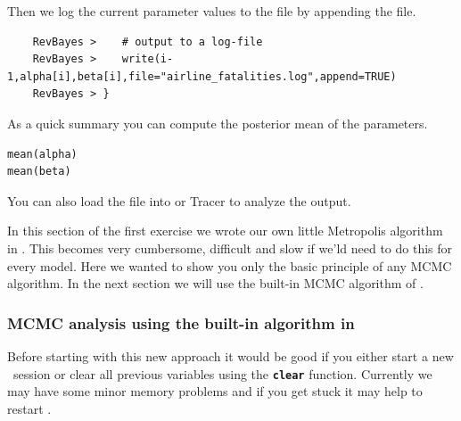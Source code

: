 \documentclass[11pt]{article}
\newcommand{\cl}[1]{{\texttt{\textbf{#1}}}}
\begin{document}
Then we log the current parameter values to the file by appending the file.
{\tt \begin{snugshade*}
\begin{lstlisting}    
    RevBayes >    # output to a log-file
    RevBayes >    write(i-1,alpha[i],beta[i],file="airline_fatalities.log",append=TRUE)
    RevBayes > }
\end{lstlisting}
\end{snugshade*}}
As a quick summary you can compute the posterior mean of the parameters.
{\tt \begin{snugshade*}
\begin{lstlisting}    
mean(alpha)
mean(beta)
\end{lstlisting}
\end{snugshade*}}
You can also load the file into \R or Tracer to analyze the output.


In this section of the first exercise we wrote our own little Metropolis algorithm in \Rev.
This becomes very cumbersome, difficult and slow if we'ld need to do this for every model.
Here we wanted to show you only the basic principle of any MCMC algorithm.
In the next section we will use the built-in MCMC algorithm of \RevBayes.




\subsubsection*{MCMC analysis using the built-in algorithm in \RevBayes}
Before starting with this new approach it would be good if you either start a new \RevBayes~session or clear all previous variables using the \cl{clear} function.
Currently we may have some minor memory problems and if you get stuck it may help to restart \RevBayes.
\end{document}
